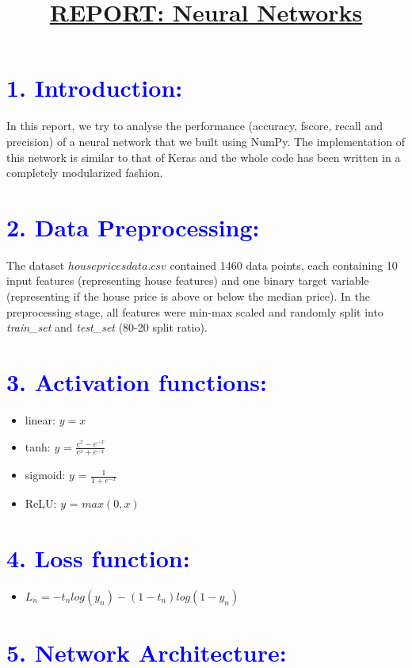 \documentclass[a4paper,10pt,twocolumn]{article}
\title{\textbf{\underline{REPORT: Neural Networks}}}
\date{}
\author{}
\begin{document}
\maketitle
\section*{\textcolor{blue}{1. Introduction:}}
In this report, we try to analyse the performance (accuracy, fscore, recall and precision) of a neural network that we built using NumPy. The implementation of this network is similar to that of Keras and the whole code has been written in a completely modularized fashion.

\section*{\textcolor{blue}{2. Data Preprocessing:}}
The dataset $housepricesdata.csv$ contained 1460 data points, each containing 10 input features (representing house features) and one binary target variable (representing if the house price is above or below the median price). In the preprocessing stage, all features were min-max scaled and randomly split into \textit{train\_set} and \textit{test\_set} (80-20 split ratio).

\section*{\textcolor{blue}{3. Activation functions:}}
\begin{itemize}
\item{linear: $y = x$}
\item{tanh: $y$ = $\frac{e^x - e^{-x}}{e^x + e^{-x}}$}
\item{sigmoid: $y$ = $\frac{1}{1 + e^{-x}}$}
\item{ReLU: $y$ = $max(0, x)$}
\end{itemize}

\section*{\textcolor{blue}{4. Loss function:}}
\begin{itemize}
\item{$L_n = -t_nlog(y_n)-(1-t_n)log(1-y_n)$} 
\end{itemize}

\section*{\textcolor{blue}{5. Network Architecture:}}
\end{document}
